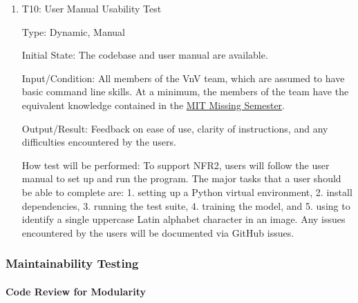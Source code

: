 \documentclass[12pt, titlepage]{article}
\begin{document}
\begin{enumerate}

\item{T10: User Manual Usability Test\\}

Type: Dynamic, Manual
					
Initial State: The codebase and user manual are available.
					
Input/Condition: All members of the VnV team, which are assumed to have basic
command line skills. At a minimum, the members of the team have the equivalent
knowledge contained in the \href{https://missing.csail.mit.edu/}{MIT Missing Semester}.

Output/Result: Feedback on ease of use, clarity of instructions, and any
difficulties encountered by the users.
					
How test will be performed: To support NFR2, users will follow the user manual
to set up and run the \progname{} program. The major tasks that a user should be
able to complete are: 1. setting up a Python virtual environment, 2. install
dependencies, 3. running the test suite, 4. training the model, and 5. using
\progname{} to identify a single uppercase Latin alphabet character in an image.
Any issues encountered by the users will be documented via GitHub issues.
\end{enumerate}

\subsubsection{Maintainability Testing}

\paragraph{Code Review for Modularity}
\end{document}

